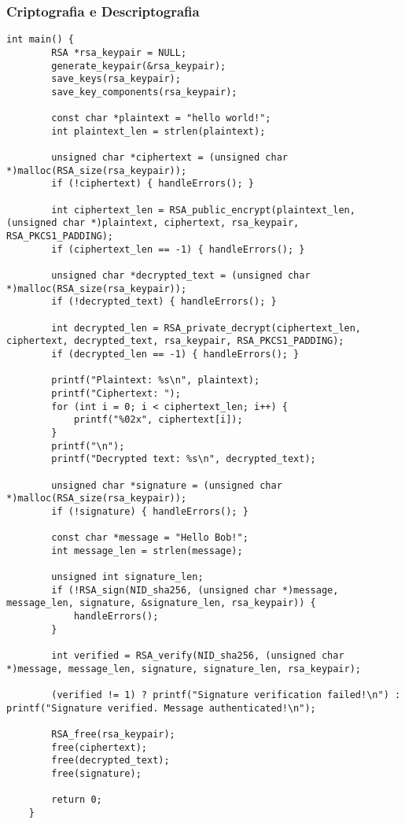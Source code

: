 \documentclass[a4paper,12pt]{article}
\begin{document}
\subsubsection*{Criptografia e Descriptografia}
\begin{lstlisting}[style=CStyle]
    int main() {
        RSA *rsa_keypair = NULL;
        generate_keypair(&rsa_keypair);
        save_keys(rsa_keypair);
        save_key_components(rsa_keypair);
    
        const char *plaintext = "hello world!";
        int plaintext_len = strlen(plaintext);
    
        unsigned char *ciphertext = (unsigned char *)malloc(RSA_size(rsa_keypair));
        if (!ciphertext) { handleErrors(); }
    
        int ciphertext_len = RSA_public_encrypt(plaintext_len, (unsigned char *)plaintext, ciphertext, rsa_keypair, RSA_PKCS1_PADDING);
        if (ciphertext_len == -1) { handleErrors(); }
    
        unsigned char *decrypted_text = (unsigned char *)malloc(RSA_size(rsa_keypair));
        if (!decrypted_text) { handleErrors(); }
    
        int decrypted_len = RSA_private_decrypt(ciphertext_len, ciphertext, decrypted_text, rsa_keypair, RSA_PKCS1_PADDING);
        if (decrypted_len == -1) { handleErrors(); }
    
        printf("Plaintext: %s\n", plaintext);
        printf("Ciphertext: ");
        for (int i = 0; i < ciphertext_len; i++) {
            printf("%02x", ciphertext[i]);
        }
        printf("\n");
        printf("Decrypted text: %s\n", decrypted_text);
    
        unsigned char *signature = (unsigned char *)malloc(RSA_size(rsa_keypair));
        if (!signature) { handleErrors(); }
    
        const char *message = "Hello Bob!";
        int message_len = strlen(message);
    
        unsigned int signature_len;
        if (!RSA_sign(NID_sha256, (unsigned char *)message, message_len, signature, &signature_len, rsa_keypair)) {
            handleErrors();
        }
    
        int verified = RSA_verify(NID_sha256, (unsigned char *)message, message_len, signature, signature_len, rsa_keypair);
    
        (verified != 1) ? printf("Signature verification failed!\n") : printf("Signature verified. Message authenticated!\n");
    
        RSA_free(rsa_keypair);
        free(ciphertext);
        free(decrypted_text);
        free(signature);
    
        return 0;
    }
\end{lstlisting}
\end{document}
